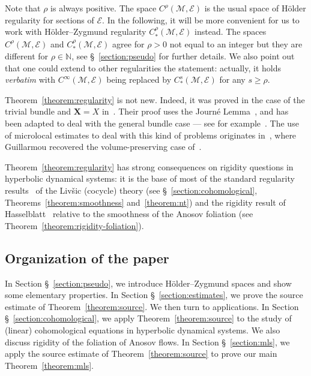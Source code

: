 \documentclass[AHL,Unicode,longabstracts,published]{cedram}
\newcommand{\N}{\mathbb{N}}
\newcommand{\X}{\mathbf{X}}
\newcommand{\M}{\mathcal{M}}
\newcommand{\E}{\mathcal{E}}
\begin{document}
Note that $\rho$ is always positive. The space $C^\rho(\M,\E)$ is the usual space of H\"older regularity for sections of $\E$. In the following, it will be more convenient for us to work with H\"older--Zygmund regularity $C^\rho_*(\M,\E)$ instead. The spaces $C^\rho(\M,\E)$ and $C^\rho_*(\M,\E)$ agree for $\rho > 0$ not equal to an integer but they are different for $\rho \in \N$, see \S~\ref{section:pseudo} for further details. We also point out that one could extend to other regularities the statement: actually, it holds \emph{verbatim} with $C^\infty(\M,\E)$ being replaced by $C^s_*(\M,\E)$ for any $s \geq \rho$.

Theorem~\ref{theorem:regularity} is not new. Indeed, it was proved in the case of the trivial bundle and $\X = X$ in~\cite{DeLaLlave-Marco-Moryon-86}. Their proof uses the Journé Lemma~\cite{Journe-86}, and has been adapted to deal with the general bundle case --- see for example~\cite{Hasselblatt-92}. The use of microlocal estimates to deal with this kind of problems originates in~\cite{Guillarmou-17-1}, where Guillarmou recovered the volume-preserving case of~\cite{DeLaLlave-Marco-Moryon-86}.

Theorem~\ref{theorem:regularity} has strong consequences on rigidity questions in hyperbolic dynamical systems: it is the base of most of the standard regularity results~\cite{DeLaLlave-Marco-Moryon-86,Livsic-72,Nitica-Torok-98} of the Liv{\v s}ic (cocycle) theory (see \S~\ref{section:cohomological}, Theorems~\ref{theorem:smoothness} and~\ref{theorem:nt}) and the rigidity result of Hasselblatt~\cite{Hasselblatt-92} relative to the smoothness of the Anosov foliation (see Theorem~\ref{theorem:rigidity-foliation}).



\subsection{Organization of the paper}
In Section \S~\ref{section:pseudo}, we introduce H\"older--Zygmund spaces and show some elementary properties. In Section \S~\ref{section:estimates}, we prove the source estimate of Theorem~\ref{theorem:source}. We then turn to applications. In Section \S~\ref{section:cohomological}, we apply Theorem~\ref{theorem:source} to the study of (linear) cohomological equations in hyperbolic dynamical systems. We also discuss rigidity of the foliation of Anosov flows. In Section \S~\ref{section:mls}, we apply the source estimate of Theorem~\ref{theorem:source} to prove our main Theorem~\ref{theorem:mls}.
\end{document}
